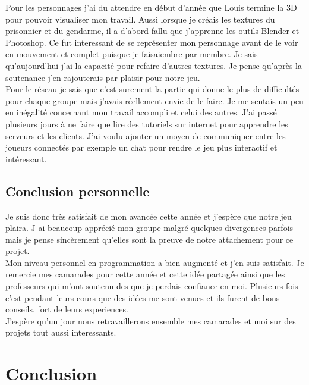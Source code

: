 \documentclass[12pt]{article}
\begin{document}
Pour les personnages j’ai du attendre en début d’année que Louis termine la 3D pour pouvoir visualiser mon travail. Aussi lorsque je créais les textures du prisonnier et du gendarme, il a d’abord fallu que j’apprenne  les outils Blender et Photoshop. Ce fut interessant de se représenter mon personnage avant de le voir en mouvement et complet puisque je faisaiembre par membre.  Je sais qu’aujourd’hui j’ai la capacité pour refaire d’autres textures. Je pense qu’après la soutenance j’en rajouterais par plaisir pour notre jeu.\\

Pour le réseau je sais que c’est surement la partie qui donne le plus de difficultés pour chaque groupe mais j’avais réellement envie de le faire. Je me sentais un peu en inégalité concernant mon travail accompli et celui des autres. J’ai passé plusieurs jours à ne faire que lire des tutoriels sur internet pour apprendre les serveurs et les clients. J’ai voulu ajouter un moyen de communiquer entre les joueurs connectés par exemple un chat pour rendre le jeu plus interactif et intéressant.\\

\newpage
\subsection{Conclusion personnelle}

Je suis donc très satisfait de mon avancée cette année et j'espère que notre jeu plaira. J ai beaucoup apprécié mon groupe malgré quelques divergences  parfois mais je pense sincèrement qu'elles sont la preuve de notre attachement pour ce projet.\\

Mon niveau personnel en programmation a bien augmenté et j'en suis satisfait. Je remercie mes camarades pour cette année et cette idée partagée ainsi que les professeurs qui m'ont soutenu des que je perdais confiance en moi. Plusieurs fois c'est pendant leurs cours que des idées me sont venues et ils furent de bons conseils, fort de leurs experiences.\\

 J'espère qu'un jour nous retravaillerons ensemble  mes camarades et moi sur des  projets tout aussi interessants.\\

\newpage

\section{Conclusion}
\end{document}
